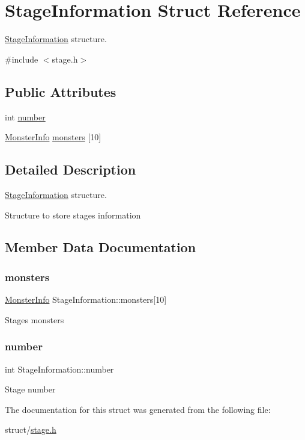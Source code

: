 \hypertarget{structStageInformation}{}\section{Stage\+Information Struct Reference}
\label{structStageInformation}


\hyperlink{structStageInformation}{Stage\+Information} structure.  




{\ttfamily \#include $<$stage.\+h$>$}

\subsection*{Public Attributes}
\begin{DoxyCompactItemize}
\item 
int \hyperlink{structStageInformation_aadee73adb461c4c6c1a80f4c08919f22}{number}
\item 
\hyperlink{monster_8h_a9cf794f86d46134ab9aedff84bd7ab31}{Monster\+Info} \hyperlink{structStageInformation_ae63c5d3a62762d079c03297607858e93}{monsters} \mbox{[}10\mbox{]}
\end{DoxyCompactItemize}


\subsection{Detailed Description}
\hyperlink{structStageInformation}{Stage\+Information} structure. 

Structure to store stage\textquotesingle{}s information 

\subsection{Member Data Documentation}
\mbox{\label{structStageInformation_ae63c5d3a62762d079c03297607858e93}} 
\subsubsection{\texorpdfstring{monsters}{monsters}}
{\footnotesize\ttfamily \hyperlink{monster_8h_a9cf794f86d46134ab9aedff84bd7ab31}{Monster\+Info} Stage\+Information\+::monsters\mbox{[}10\mbox{]}}

Stage\textquotesingle{}s monsters \mbox{\label{structStageInformation_aadee73adb461c4c6c1a80f4c08919f22}} 
\subsubsection{\texorpdfstring{number}{number}}
{\footnotesize\ttfamily int Stage\+Information\+::number}

Stage number 

The documentation for this struct was generated from the following file\+:\begin{DoxyCompactItemize}
\item 
struct/\hyperlink{stage_8h}{stage.\+h}\end{DoxyCompactItemize}
